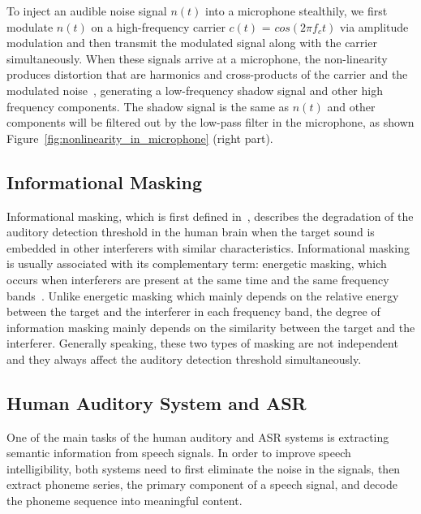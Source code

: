 To inject an audible noise signal $n(t)$ into a microphone stealthily, we first modulate $n(t)$ on a high-frequency carrier $c(t)$ = $cos(2\pi f_c t)$ via amplitude modulation and then transmit the modulated signal along with the carrier simultaneously. When these signals arrive at a microphone, the non-linearity produces distortion that are harmonics and cross-products of the carrier and the modulated noise~\cite{10.1145/3133956.3134052}, generating a low-frequency shadow signal and other high frequency components. The shadow signal is the same as $n(t)$ and other components will be filtered out by the low-pass filter in the microphone, as shown Figure~\ref{fig:nonlinearity_in_microphone} (right part).

\subsection{Informational Masking}
\label{subsec:informational_masking}
Informational masking, which is first defined in~\cite{Pollack1975-qm}, describes the degradation of the auditory detection threshold in the human brain when the target sound is embedded in other interferers with similar characteristics. Informational masking is usually associated with its complementary term: energetic masking, which occurs when interferers are present at the same time and the same frequency bands~\cite{leek_informational_1991}. Unlike energetic masking which mainly depends on the relative energy between the target and the interferer in each frequency band, the degree of information masking mainly depends on the similarity between the target and the interferer. Generally speaking, these two types of masking are not independent and they always affect the auditory detection threshold simultaneously.


\subsection{Human Auditory System and ASR}
\label{subsec:human_auditory_system_and_asr}
One of the main tasks of the human auditory and ASR systems is extracting semantic information from speech signals. In order to improve speech intelligibility, both systems need to first eliminate the noise in the signals, then extract phoneme series, the primary component of a speech signal, and decode the phoneme sequence into meaningful content. 

